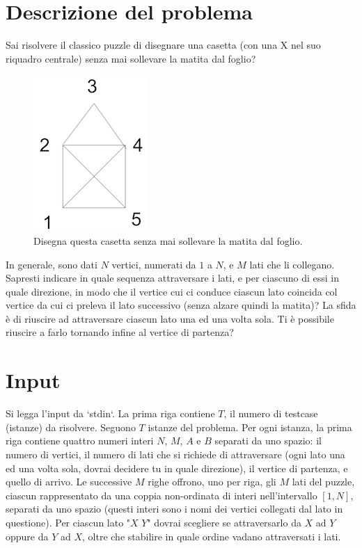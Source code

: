 \documentclass[a4paper,11pt]{article}
\begin{document}
\vspace{0.5cm}



\section*{Descrizione del problema}
   
Sai risolvere il classico puzzle di disegnare una casetta (con una X
nel suo riquadro centrale) senza mai sollevare la
matita dal foglio? 

\begin{figure}[h!]
  \centering
  \includegraphics{casetta.png}
  \caption{Disegna questa casetta senza mai sollevare la
matita dal foglio.}
\end{figure}

In generale, sono dati $N$ vertici, numerati da $1$ a
$N$, e $M$ lati che li collegano. Sapresti indicare in quale sequenza attraversare i lati, e per ciascuno di essi in quale direzione, in modo che il vertice cui ci conduce ciascun lato coincida col vertice da cui ci preleva il lato successivo (senza alzare quindi la matita)? La sfida è di riuscire ad attraversare ciascun lato una ed una volta sola.
Ti è possibile riuscire a farlo tornando infine al vertice di partenza?

\section*{Input}
Si legga l'input da `stdin`.
La prima riga contiene $T$, il numero di testcase (istanze) da risolvere. Seguono $T$
istanze del problema. Per ogni istanza, la prima riga contiene quattro numeri interi $N$,
$M$, $A$ e $B$ separati da uno spazio:
il numero di vertici, il numero di lati che si richiede di attraversare (ogni lato una ed una volta sola, dovrai decidere tu in quale direzione), il vertice di
partenza, e quello di arrivo.
Le successive $M$ righe offrono, uno per riga, gli $M$ lati del puzzle, ciascun rappresentato da una
coppia non-ordinata di interi nell'intervallo $[1,N]$, separati da uno spazio (questi interi sono i nomi dei vertici collegati dal lato in questione). Per ciascun lato "$X$ $Y$" dovrai scegliere se attraversarlo da $X$ ad $Y$ oppure da $Y$ ad $X$, oltre che stabilire in quale ordine vadano attraversati i lati.
\end{document}
